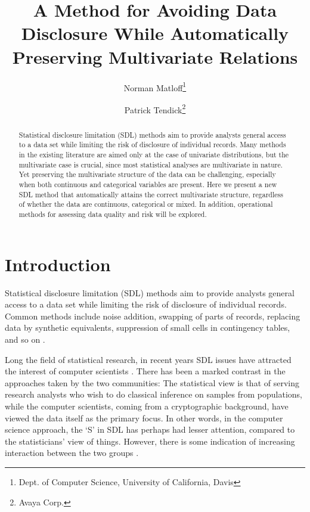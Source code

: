 \documentclass[11pt]{article}
\title{A Method for Avoiding Data Disclosure While
Automatically Preserving Multivariate Relations}
\author{
Norman Matloff\thanks{Dept. of Computer Science, University of
California, Davis}
\and
Patrick Tendick\thanks{Avaya Corp.}
}
\begin{document}
\maketitle

\begin{abstract}

\noindent 
Statistical disclosure limitation (SDL) methods aim to provide analysts
general access to a data set while limiting the risk of disclosure of
individual records.  Many methods in the existing literature are 
aimed only at the case of univariate distributions, but the 
multivariate case is crucial, since most statistical analyses are 
multivariate in nature.  Yet preserving the multivariate structure of 
the data can be challenging, especially when both continuous and
categorical variables are present.  Here we present a new SDL method 
that automatically attains the correct multivariate structure,
regardless of whether the data are continuous, categorical or mixed.  In
addition, operational methods for assessing data quality and risk will
be explored.

\end{abstract}

\section{Introduction}

Statistical disclosure limitation (SDL) methods aim to provide analysts
general access to a data set while limiting the risk of disclosure of
individual records.  Common methods include noise addition, swapping of
parts of records, replacing data by synthetic equivalents, suppression
of small cells in contingency tables, and so on \cite{duncan}. 


Long the field of statistical research, in recent years SDL issues have
attracted the interest of computer scientists \cite{dwork}.  There has
been a marked contrast in the approaches taken by the two communities:
The statistical view is that of serving research analysts who wish to do
classical inference on samples from populations, while the computer
scientists, coming from a cryptographic background, have viewed the data
itself as the primary focus.  In other words, in the computer science
approach, the `S' in SDL has perhaps had lesser attention, compared to
the statisticians' view of things.  However, there is some indication of
increasing interaction between the two groups \cite{abowd}.
\end{document}
